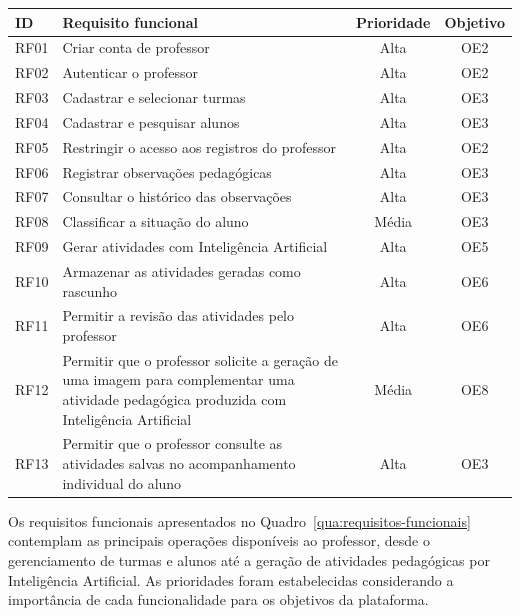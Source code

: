 \begin{quadro}[H]
\centering
\caption{Requisitos funcionais do sistema}
\label{qua:requisitos-funcionais}
\begin{tabular}{|l|p{8cm}|c|c|}
\hline
\textbf{ID} & \textbf{Requisito funcional} & \textbf{Prioridade} & \textbf{Objetivo} \\
\hline
RF01 & Criar conta de professor & Alta & OE2 \\
\hline
RF02 & Autenticar o professor & Alta & OE2 \\
\hline
RF03 & Cadastrar e selecionar turmas & Alta & OE3 \\
\hline
RF04 & Cadastrar e pesquisar alunos & Alta & OE3 \\
\hline
RF05 & Restringir o acesso aos registros do professor & Alta & OE2 \\
\hline
RF06 & Registrar observações pedagógicas & Alta & OE3 \\
\hline
RF07 & Consultar o histórico das observações & Alta & OE3 \\
\hline
RF08 & Classificar a situação do aluno & Média & OE3 \\
\hline
RF09 & Gerar atividades com Inteligência Artificial & Alta & OE5 \\
\hline
RF10 & Armazenar as atividades geradas como rascunho & Alta & OE6 \\
\hline
RF11 & Permitir a revisão das atividades pelo professor & Alta & OE6 \\
\hline
RF12 & Permitir que o professor solicite a geração de uma imagem para complementar uma atividade pedagógica produzida com Inteligência Artificial & Média & OE8 \\
\hline
RF13 & Permitir que o professor consulte as atividades salvas no acompanhamento individual do aluno & Alta & OE3 \\
\hline
\end{tabular}
\end{quadro}

Os requisitos funcionais apresentados no Quadro~\ref{qua:requisitos-funcionais} contemplam as principais operações disponíveis ao professor, desde o gerenciamento de turmas e alunos até a geração de atividades pedagógicas por Inteligência Artificial. As prioridades foram estabelecidas considerando a importância de cada funcionalidade para os objetivos da plataforma.

